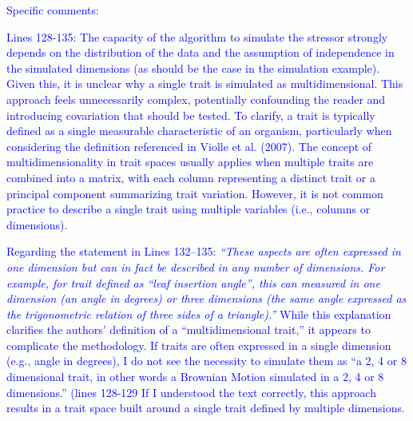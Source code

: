 \documentclass[
]{article}
\begin{document}
\textcolor{blue}{Specific comments: }

\textcolor{blue}{Lines 128-135: The capacity of the algorithm to simulate the stressor strongly depends on the distribution of the data and the assumption of independence in the simulated dimensions (as should be the case in the simulation example).
Given this, it is unclear why a single trait is simulated as multidimensional.
This approach feels unnecessarily complex, potentially confounding the reader and introducing covariation that should be tested.
To clarify, a trait is typically defined as a single measurable characteristic of an organism, particularly when considering the definition referenced in Violle et al. (2007).
The concept of multidimensionality in trait spaces usually applies when multiple traits are combined into a matrix, with each column representing a distinct trait or a principal component summarizing trait variation.
However, it is not common practice to describe a single trait using multiple variables (i.e., columns or dimensions).}

\textcolor{blue}{Regarding the statement in Lines 132–135:
\textit{“These aspects are often expressed in one dimension but can in fact be described in any number of dimensions. For example, for trait defined as “leaf insertion angle”, this can measured in one dimension (an angle in degrees) or three dimensions (the same angle expressed as the trigonometric relation of three sides of a triangle).”}
While this explanation clarifies the authors’ definition of a “multidimensional trait,” it appears to complicate the methodology.
If traits are often expressed in a single dimension (e.g., angle in degrees), I do not see the necessity to simulate them as “a 2, 4 or 8 dimensional trait, in other words a Brownian Motion simulated in a 2, 4 or 8 dimensions.” (lines 128-129 If I understood the text correctly, this approach results in a trait space built around a single trait defined by multiple dimensions.}
\end{document}
